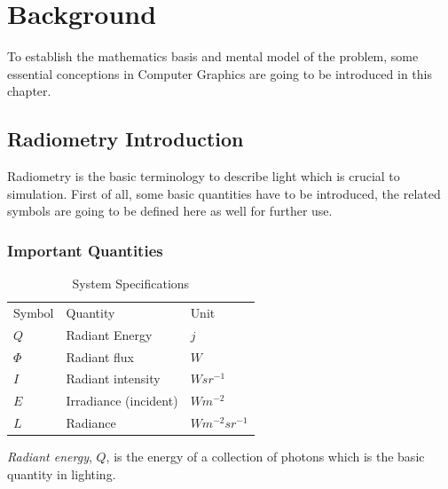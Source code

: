 \chapter{Background}


To establish the mathematics basis and mental model of the problem, some essential conceptions in Computer Graphics are going to be introduced in this chapter.  


\section{Radiometry Introduction}
Radiometry is the basic terminology to describe light which is crucial to simulation. First of all, some basic quantities have to be introduced, the related symbols are going to be defined here as well for further use.

\subsection{Important Quantities} 

\begin{table}[!ht]
\begin{center}
	\begin{tabular}{ | l | l | l |}     	
	\hline 

	Symbol & Quantity & Unit \\

	\(Q\) 			& 		Radiant Energy 				& 		\(j\) \\ 
	\(\Phi\) 			& 		Radiant flux 					& 		\(W\) \\ 
	\(I\) 			& 		Radiant intensity 				& 		\(W sr^{-1}\) \\
	\(E\)			&		Irradiance (incident) 			&		\(W m^{-2}\) \\  
	\(L\)			&		Radiance						&		\(W m^{-2} sr^{-1}\) \\ 
	
	\hline

	\end{tabular}
\end{center} 
\caption{System Specifications}
\label{tab:radiometry_quantities}
\end{table}

\emph{Radiant energy}, \(Q\), is the energy of a collection of photons which is the basic quantity in lighting. 

